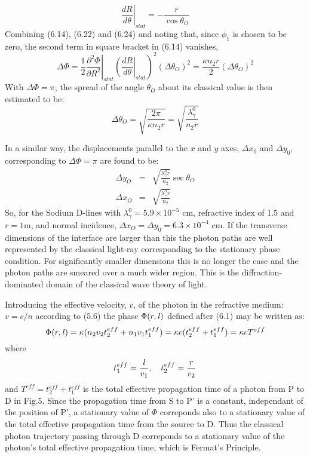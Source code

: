 {\begin{equation}
   \left. \frac{d R}{d \theta}\right|_{stat} = -\frac{r}{ \cos  \theta_O}
 \end{equation}
  Combining (6.14), (6.22) and (6.24) and noting that, since $\phi_1$ is chosen to be zero,
  the second term in square bracket in (6.14) vanishes,
    \begin{equation}
  \left. \Delta \Phi = \frac{1}{2} \frac{\partial^2 \Phi}{\partial R^2}\right|_{stat}
   \left.\left(\frac{d  R}{d \theta}\right|_{stat}\right)^2 (\Delta \theta_O)^2
   = \frac{\kappa n_2 r}{2} (\Delta \theta_O)^2
 \end{equation}
 With $\Delta \Phi = \pi$, the spread of the angle $\theta_O$ about its classical value 
   is then estimated to be:  
   \begin{equation} 
  \Delta \theta_O = \sqrt{\frac{2 \pi}{\kappa n_2 r}} = \sqrt{\frac{\lambda_{\gamma}^0}{n_2 r}}
 \end{equation}
\par In a similar way, the displacements parallel to the $x$ and $y$ axes, 
  $\Delta x_0$  and $\Delta y_0$, corresponding
 to $\Delta \Phi = \pi$ are found to be:
  \begin{eqnarray} 
  \Delta y_O & = &  \sqrt{\frac{\lambda_{\gamma}^0 r}{n_2}} \sec \theta_O \\
   \Delta x_O & = &  \sqrt{\frac{\lambda_{\gamma}^0 r}{n_2}}  
 \end{eqnarray}
  So, for the Sodium D-lines with $\lambda_{\gamma}^0 =5.9\times10^{-5}$ cm,
  refractive index of 1.5 and $r = 1$m, and normal incidence,
   $\Delta x_O =   \Delta y_0 = 6.3 \times 10^{-4}$ cm. If the transverse dimensions
 of the interface are larger than this the photon paths are well represented by
  the classical light-ray corresponding to the stationary phase condition. 
 For significantly smaller dimensions this is no longer the case and the photon paths
  are smeared over a much wider region. This is the diffraction-dominated domain of the classical
  wave theory of light.
   \par Introducing the effective velocity, $v$, of the photon in the refractive medium: $v = c/n$ according
 to (5.6) the phase $\Phi(r,{\it l})$ defined after (6.1) may be written as:
  \begin{equation}
   \Phi(r,{\it l}) = \kappa(n_2 v_2 t_2^{eff}+n_1 v_1 t_1^{eff}) =  \kappa c (t_2^{eff}+t_1^{eff})
    =  \kappa c T^{eff}
 \end{equation}
   where 
  \[ t_1^{eff} = \frac{{\it l}}{v_1},~~~t_2^{eff} = \frac{r}{v_2} \]
  and $ T^{eff} = t_2^{eff}+t_1^{eff}$ is the total effective propagation time of a photon from P to D in Fig.5.
   Since the
  propagation time from S to P' is a constant, independant of the position of P', a stationary value
   of $\Phi$ correponds  also to a stationary value of the total effective propagation time from the source to
   D. Thus the classical photon trajectory passing through D correponds to a stationary value of the
   photon's total effective propagation time, which is Fermat's Principle.


}
